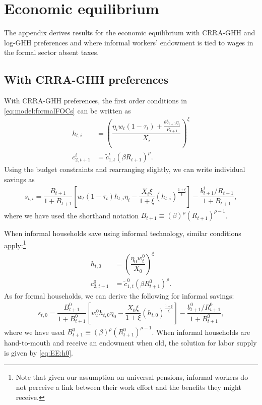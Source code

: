 \section{Economic equilibrium}\label{app:EE}\setcounter{equation}{0}
The appendix derives results for the economic equilibrium with CRRA-GHH and log-GHH preferences and where informal workers' endowment is tied to wages in the formal sector absent taxes. 
\subsection{With CRRA-GHH preferences}\label{app:EE:CRRA}
With CRRA-GHH preferences, the first order conditions in \eqref{eq:model:formalFOCs} can be written as
\begin{align*}
    h_{t,i} &= \left(\dfrac{\eta_iw_t(1-\tau_t)+\frac{\theta \overline{b}_{t+1} \eta_i}{R_{t+1}}}{X_i}\right)^{\xi} \\
    c_{2,t+1}^i &= \tilde{c}_{1,t}^i\left(\beta R_{t+1}\right)^{\rho}.
\end{align*}
Using the budget constraints and rearranging slightly, we can write individual savings as
\begin{align*}
    s_{t,i} = \dfrac{B_{t+1}}{1+B_{t+1}}\left[w_t\left(1-\tau_t\right)h_{t,i}\eta_i-\dfrac{X_{i}\xi}{1+\xi}\left(h_{t,i}\right)^{\frac{1+\xi}{\xi}}\right]-\dfrac{b_{t+1}^i/R_{t+1}}{1+B_{t+1}},
\end{align*}
where we have used the shorthand notation $B_{t+1} \equiv \left(\beta \right)^{\rho}(R_{t+1})^{\rho-1}$.


When informal households save using informal technology, similar conditions apply:\footnote{Note that given our assumption on universal pensions, informal workers do not perceive a link between their work effort and the benefits they might receive.}
\begin{align}
    h_{t,0} &= \left(\dfrac{\eta_{0}w_t^0}{X_{0}}\right)^{\xi}\label{eq:EE:h0} \\
    c_{2,t+1}^0 &= \tilde{c}_{1,t}^0\left(\beta R_{t+1}^0\right)^{\rho}. 
\end{align}
As for formal households, we can derive the following for informal savings:
\begin{align*}
    s_{t,0} = \dfrac{B_{t+1}^0}{1+B_{t+1}^0}\left[w_t^0h_{t,0}\eta_{0}-\dfrac{X_{0}\xi}{1+\xi}\left(h_{t,0}\right)^{\frac{1+\xi}{\xi}}\right]-\dfrac{b_{t+1}^0/R_{t+1}^0}{1+B_{t+1}^0},
\end{align*}
where we have used $B_{t+1}^0 \equiv \left(\beta \right)^{\rho}(R_{t+1}^0)^{\rho-1}$. When informal households are hand-to-mouth and receive an endowment when old, the solution for labor supply is given by \eqref{eq:EE:h0}.




